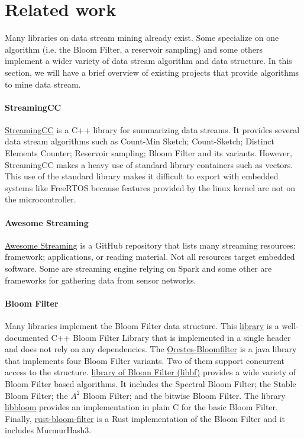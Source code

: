 \documentclass{article}
\begin{document}
\section{Related work}
\label{sec:related-work}
Many libraries on data stream mining already exist. Some specialize on one
algorithm (i.e. the Bloom Filter, a reservoir sampling) and some others implement
a wider variety of data stream algorithm and data structure. In this section, we will have a brief
overview of existing projects that provide algorithms to mine data stream.

\paragraph{StreamingCC}
	\href{https://github.com/jiecchen/StreamingCC}{StreamingCC} is a C++ library for summarizing data streams.
	It provides several data stream algorithms such as Count-Min Sketch;
	Count-Sketch; Distinct Elements Counter; Reservoir sampling; Bloom Filter and its variants.
	However, StreamingCC makes a heavy use of standard library containers such as vectors.
	This use of the standard library makes it difficult to export with embedded systems like
	FreeRTOS because features provided by the linux kernel are not on the microcontroller.

\paragraph{Awesome Streaming}
	\href{https://github.com/manuzhang/awesome-streaming}{Awesome Streaming} is a GitHub repository that lists many streaming resources:
	framework; applications, or reading material.
	Not all resources target embedded software. Some are streaming engine relying on Spark and some other are frameworks for gathering
	data from sensor networks.

\paragraph{Bloom Filter}
	Many libraries implement the Bloom Filter data structure.
	This \href{http://www.partow.net/programming/bloomfilter/index.html}{library} is a
	well-documented C++ Bloom Filter Library that is implemented in a single header
	and does not rely on any dependencies.
	The \href{https://github.com/Baqend/Orestes-Bloomfilter}{Orestes-Bloomfilter}
	is a java library that implements four Bloom Filter variants.
	Two of them support concurrent access to the structure.
	\href{http://matthias.vallentin.net/blog/2011/06/a-garden-variety-of-bloom-filters/}{library of Bloom Filter (libbf)}
	provides a wide variety of Bloom Filter based algorithms. It includes the Spectral Bloom Filter; the Stable Bloom Filter; the $A^2$ Bloom Filter; and
	the bitwise Bloom Filter.
	The library \href{https://github.com/jvirkki/libbloom}{libbloom} provides an implementation in plain C for the basic Bloom Filter.
	Finally, \href{https://github.com/brianmadden/rust-bloom-filter}{rust-bloom-filter} is a Rust implementation of the Bloom Filter
	and it includes MurmurHash3.
\end{document}

